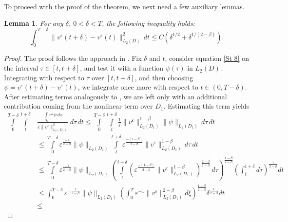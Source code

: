 \documentclass[11pt]{article}
\newtheorem{lemma}{Lemma}
\begin{document}
\medskip
To proceed with the proof of the theorem, we next need a few auxiliary lemmas.

\begin{lemma}
	For any $\delta$, $0 < \delta < T$, the following inequality holds:
	\begin{equation} \label{St 12}
		\int_{0}^{T-\delta} \|v^{\varepsilon}(t+\delta) - v^{\varepsilon}(t)\|^{2}_{L_2 (D)} \, dt 
		\leq C(\delta^{1/2} + \delta^{1/(2 - \beta)}).
	\end{equation}
\end{lemma}

\begin{proof}
	The proof follows the approach in \cite{antontsev1989boundary}.  
	Fix $\delta$ and $t$, consider equation \eqref{St 8} on the interval $\tau \in [t, t + \delta]$, and test it with a function $\psi(\tau)$ in $L_2(D)$.  
	Integrating with respect to $\tau$ over $[t, t+\delta]$, and then choosing $\psi = v^\varepsilon(t+\delta) - v^\varepsilon(t)$, we integrate once more with respect to $t \in (0, T-\delta)$.  
	After estimating terms analogously to \cite[{section~III.1.3}]{antontsev1989boundary}, we are left only with an additional contribution coming from the nonlinear term over $D_1$.  
	Estimating this term yields
\begin{align*}
	\int\limits_0^{T-\delta} \int\limits_t^{t+\delta}& \frac{\int\limits_{D_1} v^\varepsilon \psi \, dx}{\varepsilon \|v^\varepsilon\|_{L_2(D_1)}^\beta} \, d\tau \, dt
	\leq \int\limits_0^{T-\delta} \int\limits_t^{t+\delta} \frac{1}{\varepsilon} \|v^\varepsilon\|_{L_2(D_1)}^{1-\beta} \|\psi\|_{L_2(D_1)} \, d\tau \, dt  \\
	&\leq \int\limits_0^{T-\delta} \varepsilon^{\frac{-1}{2-\beta}} \|\psi\|_{L_2(D_1)} 
	\int\limits_t^{t+\delta} \varepsilon^{\frac{-(1-\beta)}{2-\beta}} \|v^\varepsilon\|_{L_2(D_1)}^{1-\beta} \, d\tau \, dt \\
	&\leq \int\limits_0^{T-\delta} \varepsilon^{\frac{-1}{2-\beta}} \|\psi\|_{L_2(D_1)} 
	\left( \int\limits_t^{t+\delta} \left( \varepsilon^{\frac{-(1-\beta)}{2-\beta}} \|v^\varepsilon\|_{L_2(D_1)}^{1-\beta} \right)^{\frac{2-\beta}{1-\beta}} \, d\tau \right)^{\frac{1-\beta}{2-\beta}} \left(\int_{t}^{t+\delta} d\tau\right)^{\frac{1}{2-\beta}}dt \\
	&\leq \int_{0}^{T-\delta} \varepsilon^{-\frac{1}{2-\beta}} \| \psi \|_{L_2 (D_1)} \left( \int_{0}^{T} \varepsilon^{-1} \|v^{\varepsilon} \|^{2-\beta}_{L_2 (D_1)} d\xi \right)^{\frac{1-\beta}{2-\beta}} \delta^{\frac{1}{2-\beta}} dt\\ &\leq

\end{align*}
\end{proof}
\end{document}
